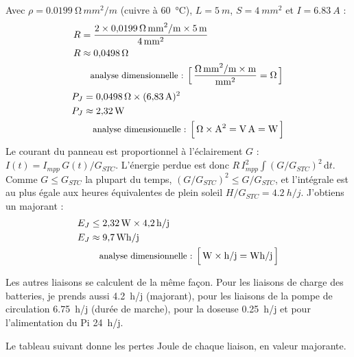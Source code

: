 \begin{demonstration}
Avec $\rho = \qty{0,0199}{\ohm\,mm^2/m}$ (cuivre à \qty{60}{\celsius}), $L = \qty{5}{m}$, $S = \qty{4}{mm^2}$ et $I = \qty{6,83}{A}$ :
\begin{align*}
R &= \frac{2 \times \qty{0,0199}{\ohm\,mm^2/m} \times \qty{5}{m}}{\qty{4}{mm^2}}\\
R &\approx \qty{0,0498}{\ohm}\\
\dimline{\dfrac{\unit{\ohm\,mm^2/m}\times\unit{m}}{\unit{mm^2}}=\unit{\ohm}}
\end{align*}
\begin{align*}
P_J &= \qty{0,0498}{\ohm} \times (\qty{6,83}{A})^2\\
P_J &\approx \qty{2,32}{W}\\
\dimline{\unit{\ohm}\times\unit{A^2}=\unit{V\,A}=\unit{W}}
\end{align*}
Le courant du panneau est proportionnel à l'éclairement $G$ : $I(t) = I_{mpp}\,G(t)/G_{STC}$. L'énergie perdue est donc $R\,I_{mpp}^2\int (G/G_{STC})^2\,\mathrm{d}t$. Comme $G \leq G_{STC}$ la plupart du temps, $(G/G_{STC})^2 \leq G/G_{STC}$, et l'intégrale est au plus égale aux heures équivalentes de plein soleil $H/G_{STC} = \qty{4,2}{h/j}$. J'obtiens un majorant :
\begin{align*}
E_J &\leq \qty{2,32}{W} \times \qty{4,2}{h/j}\\
E_J &\approx \qty{9,7}{Wh/j}\\
\dimline{\unit{W}\times\unit{h/j}=\unit{Wh/j}}
\end{align*}
\end{demonstration}

Les autres liaisons se calculent de la même façon. Pour les liaisons de charge des batteries, je prends aussi \qty{4,2}{h/j} (majorant), pour les liaisons de la pompe de circulation \qty{6,75}{h/j} (durée de marche), pour la doseuse \qty{0,25}{h/j} et pour l'alimentation du Pi \qty{24}{h/j}.

Le tableau suivant donne les pertes Joule de chaque liaison, en valeur majorante.

